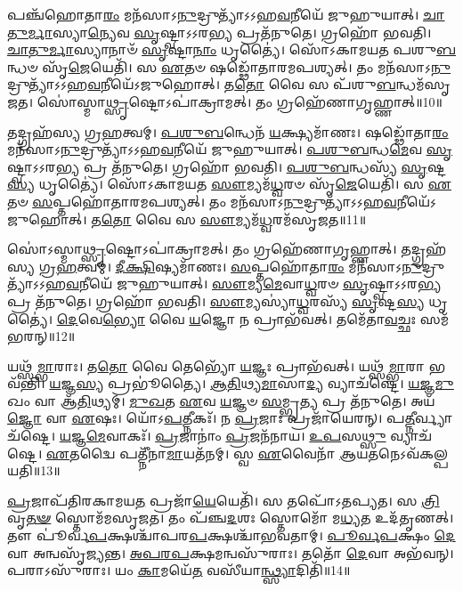 𑌪𑌞𑍍𑌚᳴𑌹𑍋𑌤𑌾\-\ul{𑌰𑌂} 𑌮𑌨᳴𑌸𑌾\-𑌽\-\ul{𑌨𑍁}\-𑌦𑍍𑌰𑍁𑌤𑍍𑌯𑌾᳴\-𑌽𑌽𑌹\-\ul{𑌵}\-𑌨𑍀𑌯𑍇᳴ 𑌜𑍁𑌹𑍁𑌯𑌾𑌤𑍍।
\-\ul{𑌚𑌾}\-\-\ul{𑌤𑍁}\-\-\ul{𑌰𑍍𑌮𑌾}\-𑌸𑍍𑌯𑌾\-\-\ul{𑌨𑍍𑌯𑍇}\-𑌵 \ul{𑌸𑍃}\-𑌷𑍍𑌟𑍍𑌵𑌾\-𑌽𑌽𑌰\-\ul{𑌭𑍍𑌯} 𑌪𑍍𑌰𑌤᳴𑌨𑍁𑌤𑍇।
𑌗𑍍𑌰𑌹𑍋᳴ 𑌭𑌵𑌤𑌿।
\-\ul{𑌚𑌾}\-\-\ul{𑌤𑍁}\-\-\ul{𑌰𑍍𑌮𑌾}\-𑌸𑍍𑌯𑌾𑌨𑌾𑍞᳴ \ul{𑌸𑍃}\-𑌷𑍍𑌟𑌾\-\ul{𑌨𑌾𑌂} 𑌧𑍃𑌤𑍍𑌯𑍈॑।
𑌸𑍋᳴𑌽𑌕𑌾𑌮𑌯𑌤 𑌪𑌶𑍁\-\ul{𑌬}\-𑌨𑍍𑌧𑍞 𑌸𑍃᳴\-\ul{𑌜𑍇}\-𑌯𑍇𑌤𑌿᳴।
𑌸 \ul{𑌏}\-𑌤𑍞 𑌷𑌡𑍍𑌢𑍋᳴𑌤𑌾𑌰𑌮𑌪𑌶𑍍𑌯𑌤𑍍।
𑌤𑌂 𑌮𑌨᳴𑌸𑌾\-𑌽\-\ul{𑌨𑍁}\-𑌦𑍍𑌰𑍁𑌤𑍍𑌯𑌾᳴\-𑌽𑌽𑌹\-\ul{𑌵}\-𑌨𑍀𑌯𑍇᳴\-𑌽𑌜𑍁𑌹𑍋𑌤𑍍।
𑌤\-\ul{𑌤𑍋} 𑌵𑍈 𑌸 𑌪᳴𑌶𑍁\-\ul{𑌬}\-𑌨𑍍𑌧𑌮᳴\-𑌸𑍃𑌜𑌤।
𑌸𑍋॑𑌸𑍍𑌮𑌾\-\ul{𑌥𑍍𑌸𑍃}\-𑌷𑍍𑌟𑍋\-𑌽𑌪𑌾॑𑌕𑍍𑌰𑌾𑌮𑌤𑍍।
𑌤𑌂 𑌗𑍍𑌰𑌹𑍇᳴𑌣𑌾𑌗𑍃𑌹𑍍𑌣𑌾𑌤𑍍॥10॥

𑌤𑌦𑍍𑌗𑍍𑌰𑌹᳴𑌸𑍍𑌯 𑌗𑍍𑌰\-\ul{𑌹}\-𑌤𑍍𑌵𑌮𑍍।
\-\ul{𑌪}\-\-\ul{𑌶𑍁}\-\-\ul{𑌬}\-𑌨𑍍𑌧𑍇𑌨᳴ \ul{𑌯}\-𑌕𑍍𑌷𑍍𑌯𑌮𑌾᳴𑌣𑌃।
𑌷𑌡𑍍𑌢𑍋᳴𑌤𑌾\-\ul{𑌰𑌂} 𑌮𑌨᳴𑌸𑌾\-𑌽\-\ul{𑌨𑍁}\-𑌦𑍍𑌰𑍁𑌤𑍍𑌯𑌾᳴\-𑌽𑌽𑌹\-\ul{𑌵}\-𑌨𑍀𑌯𑍇᳴ 𑌜𑍁𑌹𑍁𑌯𑌾𑌤𑍍।
\-\ul{𑌪}\-\-\ul{𑌶𑍁}\-\-\ul{𑌬}\-𑌨𑍍𑌧\-\ul{𑌮𑍇}\-𑌵 \ul{𑌸𑍃}\-𑌷𑍍𑌟𑍍𑌵𑌾\-𑌽𑌽𑌰\-\ul{𑌭𑍍𑌯} 𑌪𑍍𑌰 𑌤᳴𑌨𑍁𑌤𑍇।
𑌗𑍍𑌰𑌹𑍋᳴ 𑌭𑌵𑌤𑌿।
\-\ul{𑌪}\-\-\ul{𑌶𑍁}\-\-\ul{𑌬}\-𑌨𑍍𑌧𑌸𑍍𑌯᳴ \ul{𑌸𑍃}\-𑌷𑍍𑌟\-\ul{𑌸𑍍𑌯} 𑌧𑍃𑌤𑍍𑌯𑍈॑।
𑌸𑍋᳴𑌽𑌕𑌾𑌮𑌯𑌤 \ul{𑌸𑍗}\-𑌮𑍍𑌯𑌮᳴\-\ul{𑌧𑍍𑌵}\-𑌰𑍞 𑌸𑍃᳴\-\ul{𑌜𑍇}\-𑌯𑍇𑌤𑌿᳴।
𑌸 \ul{𑌏}\-𑌤𑍞 \ul{𑌸}\-𑌪𑍍𑌤𑌹𑍋᳴𑌤𑌾𑌰𑌮𑌪𑌶𑍍𑌯𑌤𑍍।
𑌤𑌂 𑌮𑌨᳴𑌸𑌾\-𑌽\-\ul{𑌨𑍁}\-𑌦𑍍𑌰𑍁𑌤𑍍𑌯𑌾᳴\-𑌽𑌽𑌹\-\ul{𑌵}\-𑌨𑍀𑌯𑍇᳴\-𑌽𑌜𑍁𑌹𑍋𑌤𑍍।
𑌤\-\ul{𑌤𑍋} 𑌵𑍈 𑌸 \ul{𑌸𑍗}\-𑌮𑍍𑌯𑌮᳴\-\ul{𑌧𑍍𑌵}\-𑌰𑌮᳴\-𑌸𑍃𑌜𑌤॥11॥

𑌸𑍋॑𑌽𑌸𑍍𑌮𑌾\-\ul{𑌥𑍍𑌸𑍃}\-𑌷𑍍𑌟𑍋\-𑌽𑌪𑌾॑𑌕𑍍𑌰𑌾𑌮𑌤𑍍।
𑌤𑌂 𑌗𑍍𑌰𑌹𑍇᳴𑌣𑌾𑌗𑍃𑌹𑍍𑌣𑌾𑌤𑍍।
𑌤𑌦𑍍𑌗𑍍𑌰𑌹᳴𑌸𑍍𑌯 𑌗𑍍𑌰\-\ul{𑌹}\-𑌤𑍍𑌵𑌮𑍍।
\-\ul{𑌦𑍀}\-\-\ul{𑌕𑍍𑌷𑌿}\-𑌷𑍍𑌯𑌮𑌾᳴𑌣𑌃।
\-\ul{𑌸}\-𑌪𑍍𑌤𑌹𑍋᳴𑌤𑌾\-\ul{𑌰𑌂} 𑌮𑌨᳴𑌸𑌾\-𑌽\-\ul{𑌨𑍁}\-𑌦𑍍𑌰𑍁𑌤𑍍𑌯𑌾᳴\-𑌽𑌽𑌹\-\ul{𑌵}\-𑌨𑍀𑌯𑍇᳴ 𑌜𑍁𑌹𑍁𑌯𑌾𑌤𑍍।
\-\ul{𑌸𑍗}\-𑌮𑍍𑌯\-\ul{𑌮𑍇}\-𑌵𑌾\-\ul{𑌧𑍍𑌵}\-𑌰𑍞 \ul{𑌸𑍃}\-𑌷𑍍𑌟𑍍𑌵𑌾\-𑌽𑌽𑌰\-\ul{𑌭𑍍𑌯} 𑌪𑍍𑌰 𑌤᳴𑌨𑍁𑌤𑍇।
𑌗𑍍𑌰𑌹𑍋᳴ 𑌭𑌵𑌤𑌿।
\-\ul{𑌸𑍗}\-𑌮𑍍𑌯𑌸𑍍𑌯𑌾॑\-\ul{𑌧𑍍𑌵}\-𑌰𑌸𑍍𑌯᳴ \ul{𑌸𑍃}\-𑌷𑍍𑌟\-\ul{𑌸𑍍𑌯} 𑌧𑍃𑌤𑍍𑌯𑍈॑।
\-\ul{𑌦𑍇}\-𑌵𑍇\-\ul{𑌭𑍍𑌯𑍋} 𑌵𑍈 \ul{𑌯}\-𑌜𑍍𑌞𑍋 𑌨 𑌪𑍍𑌰𑌾𑌭᳴𑌵𑌤𑍍।
𑌤𑌮𑍇᳴𑌤𑌾\-\ul{𑌵}\-𑌚𑍍𑌛𑌃 𑌸𑌮᳴𑌭𑌰𑌨𑍍॥12॥

𑌯𑌥𑍍𑌸᳴\-\ul{𑌮𑍍𑌭𑌾}\-𑌰𑌾𑌃।
𑌤\-\ul{𑌤𑍋} 𑌵𑍈 𑌤𑍇𑌭𑍍𑌯𑍋᳴ \ul{𑌯}\-𑌜𑍍𑌞𑌃 𑌪𑍍𑌰𑌾𑌭᳴𑌵𑌤𑍍।
𑌯𑌥𑍍𑌸᳴\-\ul{𑌮𑍍𑌭𑌾}\-𑌰𑌾 𑌭𑌵᳴𑌨𑍍𑌤𑌿।
\-\ul{𑌯}\-𑌜𑍍𑌞\-\ul{𑌸𑍍𑌯} 𑌪𑍍𑌰𑌭𑍂॑𑌤𑍍𑌯𑍈।
\-\ul{𑌆}\-\-\ul{𑌤𑌿}\-𑌥𑍍𑌯\-\ul{𑌮𑌾}\-𑌸𑌾\-\ul{𑌦𑍍𑌯} 𑌵𑍍𑌯𑌾𑌚᳴𑌷𑍍𑌟𑍇।
\-\ul{𑌯}\-\-\ul{𑌜𑍍𑌞}\-\-\ul{𑌮𑍁}\-𑌖𑌂 𑌵𑌾 𑌆᳴\-\ul{𑌤𑌿}\-𑌥𑍍𑌯𑌮𑍍।
\-\ul{𑌮𑍁}\-\-\ul{𑌖}\-𑌤 \ul{𑌏}\-𑌵 \ul{𑌯}\-𑌜𑍍𑌞𑍞 \ul{𑌸}\-𑌮𑍍𑌭𑍃\-\ul{𑌤𑍍𑌯} 𑌪𑍍𑌰 𑌤᳴𑌨𑍁𑌤𑍇।
𑌅𑌯᳴\-\ul{𑌜𑍍𑌞𑍋} 𑌵𑌾 \ul{𑌏}\-𑌷𑌃।
𑌯𑍋᳴𑌽\-\ul{𑌪}\-𑌤𑍍𑌨𑍀𑌕𑌃᳴।
𑌨 \ul{𑌪𑍍𑌰}\-𑌜𑌾𑌃 𑌪𑍍𑌰𑌜𑌾᳴𑌯𑍇𑌰𑌨𑍍।
𑌪\-\ul{𑌤𑍍𑌨𑍀}\-𑌰𑍍𑌵𑍍𑌯𑌾𑌚᳴𑌷𑍍𑌟𑍇।
\-\ul{𑌯}\-𑌜𑍍𑌞\-\ul{𑌮𑍇}\-𑌵𑌾𑌕𑌃᳴।
\-\ul{𑌪𑍍𑌰}\-𑌜𑌾𑌨𑌾𑌂॑ \ul{𑌪𑍍𑌰}\-𑌜𑌨᳴𑌨𑌾𑌯।
\-\ul{𑌉}\-\-\ul{𑌪}\-𑌸\-\ul{𑌥𑍍𑌸𑍁} 𑌵𑍍𑌯𑌾𑌚᳴𑌷𑍍𑌟𑍇।
\-\ul{𑌏}\-𑌤𑌦𑍍𑌵𑍈 𑌪𑌤𑍍𑌨𑍀᳴𑌨𑌾\-\ul{𑌮𑌾}\-𑌯𑌤᳴𑌨𑌮𑍍।
𑌸𑍍𑌵 \ul{𑌏}\-𑌵𑍈𑌨𑌾᳴ \ul{𑌆}\-𑌯\-\ul{𑌤}\-𑌨𑍇\-𑌽𑌵᳴𑌕𑌲𑍍𑌪𑌯𑌤𑌿॥13॥\anuvakamend[\-\ul{𑌤}\-\-\ul{𑌨𑍁}\-\-\ul{𑌤} \ul{𑌆}\-𑌲𑌭᳴𑌮𑌾𑌨𑍋\-𑌽𑌗𑍃𑌹𑍍𑌣𑌾𑌦\-𑌸𑍃𑌜𑌤𑌾𑌭𑌰𑌞𑍍𑌜𑌾𑌯𑍇\-\ul{𑌰}\-𑌨𑍍𑌥𑍍𑌷𑌟𑍍𑌚᳴]

\-\ul{𑌪𑍍𑌰}\-𑌜𑌾𑌪᳴𑌤𑌿𑌰𑌕𑌾𑌮𑌯\-\ul{𑌤} 𑌪𑍍𑌰𑌜𑌾᳴\-\ul{𑌯𑍇}\-𑌯𑍇𑌤𑌿᳴।
𑌸 𑌤𑌪𑍋᳴\-𑌽𑌤𑌪𑍍𑌯𑌤।
𑌸 \ul{𑌤𑍍𑌰𑌿}\-𑌵𑍃\-\ul{𑌤}\-\-\ul{𑍟} 𑌸𑍍𑌤𑍋𑌮᳴𑌮\-𑌸𑍃𑌜𑌤।
𑌤𑌂 𑌪᳴𑌞𑍍𑌚\-\ul{𑌦}\-𑌶𑌃 𑌸𑍍𑌤𑍋𑌮𑍋᳴ 𑌮\-\ul{𑌧𑍍𑌯}\-𑌤 𑌉𑌦᳴𑌤𑍃𑌣𑌤𑍍।
𑌤𑍗 𑌪𑍂॑𑌰𑍍𑌵\-\ul{𑌪}\-𑌕𑍍𑌷𑌶𑍍𑌚𑌾᳴𑌪𑌰\-\ul{𑌪}\-𑌕𑍍𑌷𑌶𑍍𑌚𑌾᳴𑌭𑌵𑌤𑌾𑌮𑍍।
\-\ul{𑌪𑍂}\-\-\ul{𑌰𑍍𑌵}\-\-\ul{𑌪}\-𑌕𑍍𑌷𑌂 \ul{𑌦𑍇}\-𑌵𑌾 𑌅𑌨𑍍𑌵𑌸𑍃᳴𑌜𑍍𑌯𑌨𑍍𑌤।
\-\ul{𑌅}\-\-\ul{𑌪}\-\-\ul{𑌰}\-\-\ul{𑌪}\-𑌕𑍍𑌷𑌮𑌨𑍍𑌵𑌸𑍁᳴𑌰𑌾𑌃।
𑌤𑌤𑍋᳴ \ul{𑌦𑍇}\-𑌵𑌾 𑌅𑌭᳴𑌵𑌨𑍍।
𑌪𑌰𑌾𑌽𑌸𑍁᳴𑌰𑌾𑌃।
𑌯𑌂 \ul{𑌕𑌾}\-𑌮𑌯𑍇᳴\-\ul{𑌤} 𑌵𑌸𑍀᳴𑌯𑌾\-\ul{𑌨𑍍𑌥𑍍𑌸𑍍𑌯𑌾}\-𑌦𑌿𑌤𑌿᳴॥14॥

